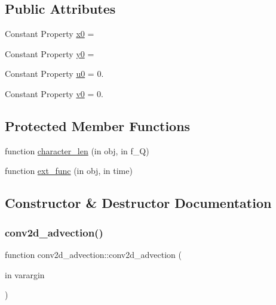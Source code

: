 \subsection*{Public Attributes}
\begin{DoxyCompactItemize}
\item 
Constant Property \hyperlink{classconv2d__advection_a094162f8b370a8bded121e1fedbebacb}{x0} =
\item 
Constant Property \hyperlink{classconv2d__advection_a69dd5d2e161e02f8ae9d16da88dc0b00}{y0} =
\item 
Constant Property \hyperlink{classconv2d__advection_a817c42e327b0258bd5df91009052a938}{u0} = 0.
\item 
Constant Property \hyperlink{classconv2d__advection_a93dc8697310f632fc1c1b4acda4b162b}{v0} = 0.
\end{DoxyCompactItemize}
\subsection*{Protected Member Functions}
\begin{DoxyCompactItemize}
\item 
function \hyperlink{classconv2d__advection_a1bd7fcd5523489945e7294630043de7e}{character\+\_\+len} (in obj, in f\+\_\+Q)
\item 
function \hyperlink{classconv2d__advection_a748b69f9d3841adaab52df0b84754b05}{ext\+\_\+func} (in obj, in time)
\end{DoxyCompactItemize}


\subsection{Constructor \& Destructor Documentation}
\mbox{\label{classconv2d__advection_af9701d710178f870edd4d4012ad6dbef}} 
\subsubsection{\texorpdfstring{conv2d\+\_\+advection()}{conv2d\_advection()}}
{\footnotesize\ttfamily function conv2d\+\_\+advection\+::conv2d\+\_\+advection (\begin{DoxyParamCaption}\item[{in}]{varargin }\end{DoxyParamCaption})}



